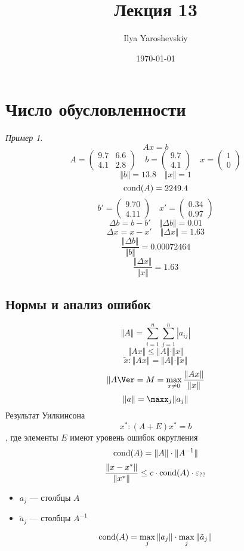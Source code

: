 \documentclass[english]{article}
\author{Ilya Yaroshevskiy}
\date{\today}
\title{Лекция 13}
\newcommand{\todo}{{\color{red}\fbox{\text{Доделать}}}}
\theoremstyle{plain}
\theoremstyle{remark}
\newtheorem*{examp}{Пример}
\theoremstyle{definition}
\begin{document}
\maketitle
\tableofcontents


\section{Число обусловленности}
\label{sec:org7534b8b}
\newcommand{\cond}{\mathop{\rm cond}\nolimits}

\begin{examp}
\[ Ax = b \]
\[ A = \begin{pmatrix}
9.7 & 6.6 \\
4.1 & 2. 8
\end{pmatrix}\quad b = \begin{pmatrix}
9.7 \\
4.1
\end{pmatrix}\quad  x = \begin{pmatrix}
1 \\
0
\end{pmatrix}\]
\[ \Vert b \Vert = 13.8 \quad \Vert x \Vert = 1 \]
\[ \cond(A) = 2249.4 \]
\[ b' = \begin{pmatrix}
9.70 \\
4.11
\end{pmatrix} \quad x' = \begin{pmatrix}
0.34 \\
0.97
\end{pmatrix}\]
\[ \Delta b = b - b' \quad \Vert \Delta b \Vert = 0.01 \]
\[ \Delta x = x - x' \quad \Vert \Delta x \Vert = 1.63 \]
\[ \frac{\Vert \Delta b \Vert}{\Vert b \Vert} =0.00072464 \]
\[ \frac{\Vert \Delta x \Vert}{\Vert x \Vert} = 1.63 \]
\end{examp}
\subsection{Нормы и анализ ошибок}
\label{sec:orgfac5e00}
\[ \Vert A \Vert = \sum_{i = 1}^n \sum_{j = 1}^n |a_{ij}| \]
\[ \Vert A x \Vert \le \Vert A \Vert \cdot \Vert x \Vert \]
\[ \tilde{x}: \Vert A x \Vert = \Vert A \Vert \cdot \Vert \tilde{x} \Vert \]
\[ \Vert A \Ver = M = \max_{x \neq 0} \frac{\Vert A x \Vert}{\Vert x \Vert} \]
\[ \Vert a \Vert = \maxx_j \Vert a_j \Vert \]
Результат Уилкинсона
\[ x^*: (A + E) x^* = b \], где элементы \(E\) имеют уровень ошибок  округления
\todo
\[ \cond(A) = \Vert A \Vert \cdot \Vert A^{-1} \Vert \]
\[ \frac{\Vert x - x^* \Vert}{\Vert x^* \Vert} \le c \cdot \cond(A)\cdot \varepsilon_{??} \]
\begin{itemize}
\item \(a_j\) --- столбцы \(A\)
\item \(\tilde{a}_j\) --- столбцы \(A^{-1}\)
\end{itemize}
\[ \cond(A) = \max_j \Vert a_j \Vert \cdot \max_j \Vert \tilde{a}_j \Vert \]
\end{document}
